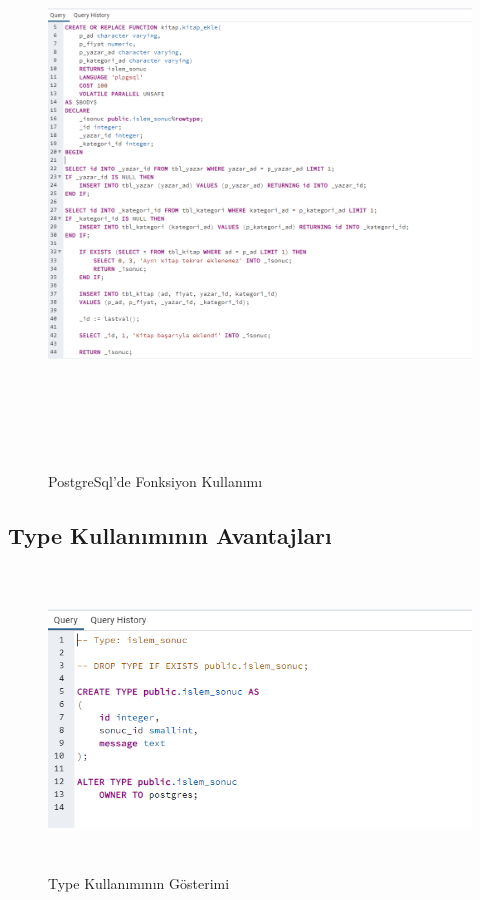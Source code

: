 \documentclass[12pt, a4paper]{article}
\begin{document}
	 \begin{figure}[htbp]
		\centering
		\includegraphics[width=15cm, height=15cm]{ekleFonksiyon.png}
		\caption{PostgreSql'de Fonksiyon Kullanımı}
		\label{fig:fonksiyon}
	\end{figure}

	\subsection{Type Kullanımının Avantajları}
	
	  \begin{figure}[htbp]
		\centering
		\includegraphics[width=\textwidth, height=8cm]{type.png}
		\caption{Type Kullanımının Gösterimi}
		\label{fig:type}
	\end{figure}
	
\end{document}

